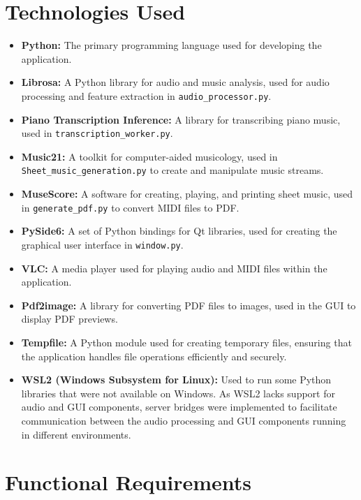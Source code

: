 \documentclass{article}
\begin{document}
\section{Technologies Used}
\begin{itemize}
    \item \textbf{Python:} The primary programming language used for developing the application.
    \item \textbf{Librosa:} A Python library for audio and music analysis, used for audio processing and feature extraction in \texttt{audio\_processor.py}.
    \item \textbf{Piano Transcription Inference:} A library for transcribing piano music, used in \texttt{transcription\_worker.py}.
    \item \textbf{Music21:} A toolkit for computer-aided musicology, used in \texttt{Sheet\_music\_generation.py} to create and manipulate music streams.
    \item \textbf{MuseScore:} A software for creating, playing, and printing sheet music, used in \texttt{generate\_pdf.py} to convert MIDI files to PDF.
    \item \textbf{PySide6:} A set of Python bindings for Qt libraries, used for creating the graphical user interface in \texttt{window.py}.
    \item \textbf{VLC:} A media player used for playing audio and MIDI files within the application.
    \item \textbf{Pdf2image:} A library for converting PDF files to images, used in the GUI to display PDF previews.
    \item \textbf{Tempfile:} A Python module used for creating temporary files, ensuring that the application handles file operations efficiently and securely.
    \item \textbf{WSL2 (Windows Subsystem for Linux):} Used to run some Python libraries that were not available on Windows. As WSL2 lacks support for audio and GUI components, server bridges were implemented to facilitate communication between the audio processing and GUI components running in different environments.
\end{itemize}

\section{Functional Requirements}
\end{document}
